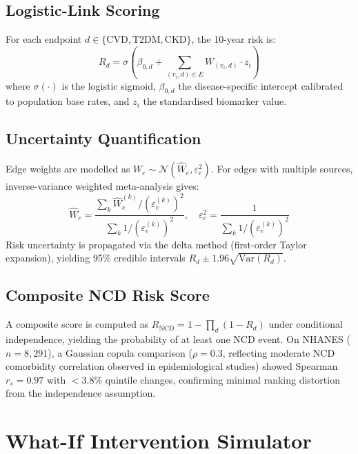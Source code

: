 \documentclass[runningheads]{llncs}
\begin{document}
\subsection{Logistic-Link Scoring}\label{sec:logistic}

For each endpoint $d \in \{\text{CVD}, \text{T2DM}, \text{CKD}\}$,
the 10-year risk is:
\begin{equation}\label{eq:risk}
R_d = \sigma\!\left(\beta_{0,d} + \sum_{(v_i, d) \in E} W_{(v_i,d)} \cdot z_i\right)
\end{equation}
where $\sigma(\cdot)$ is the logistic sigmoid, $\beta_{0,d}$ the
disease-specific intercept calibrated to population base rates, and
$z_i$ the standardised biomarker value.

\subsection{Uncertainty Quantification}\label{sec:uncert}

Edge weights are modelled as $W_e \sim \mathcal{N}(\hat{W}_e,
\varepsilon_e^2)$.
For edges with multiple sources, inverse-variance weighted
meta-analysis gives:
\begin{equation}\label{eq:meta}
\hat{W}_e = \frac{\sum_k \hat{W}_e^{(k)} / (\varepsilon_e^{(k)})^2}
{\sum_k 1 / (\varepsilon_e^{(k)})^2}, \quad
\varepsilon_e^2 = \frac{1}{\sum_k 1 / (\varepsilon_e^{(k)})^2}
\end{equation}
Risk uncertainty is propagated via the delta method (first-order
Taylor expansion), yielding 95\% credible intervals
$R_d \pm 1.96\sqrt{\mathrm{Var}(R_d)}$.

\subsection{Composite NCD Risk Score}\label{sec:composite}

A composite score is computed as
$R_{\mathrm{NCD}} = 1 - \prod_{d} (1 - R_d)$
under conditional independence, yielding the probability of at least
one NCD event.
On NHANES ($n = 8{,}291$), a Gaussian copula comparison
($\rho = 0.3$, reflecting moderate NCD comorbidity correlation
observed in epidemiological studies) showed Spearman $r_s = 0.97$
with $<$3.8\% quintile changes, confirming minimal ranking
distortion from the independence assumption.

\section{What-If Intervention Simulator}\label{sec:whatif}
\end{document}
